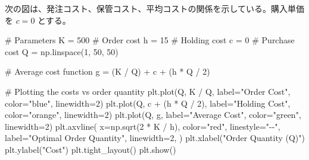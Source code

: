 \documentclass[
  japanese,
  letterpaper,
]{ltjbook}
\newenvironment{Shaded}{\begin{snugshade}}{\end{snugshade}}
\newcommand{\CommentTok}[1]{\textcolor[rgb]{0.37,0.37,0.37}{#1}}
\newcommand{\DecValTok}[1]{\textcolor[rgb]{0.68,0.00,0.00}{#1}}
\newcommand{\NormalTok}[1]{\textcolor[rgb]{0.00,0.23,0.31}{#1}}
\newcommand{\OperatorTok}[1]{\textcolor[rgb]{0.37,0.37,0.37}{#1}}
\newcommand{\StringTok}[1]{\textcolor[rgb]{0.13,0.47,0.30}{#1}}
\theoremstyle{plain}
\theoremstyle{definition}
\theoremstyle{remark}
\begin{document}
次の図は、発注コスト、保管コスト、平均コストの関係を示している。購入単価を
\(c = 0\) とする。

\begin{Shaded}
\begin{Highlighting}[]
\CommentTok{\# Parameters}
\NormalTok{K }\OperatorTok{=} \DecValTok{500}  \CommentTok{\# Order cost}
\NormalTok{h }\OperatorTok{=} \DecValTok{15}  \CommentTok{\# Holding cost}
\NormalTok{c }\OperatorTok{=} \DecValTok{0}  \CommentTok{\# Purchase cost}
\NormalTok{Q }\OperatorTok{=}\NormalTok{ np.linspace(}\DecValTok{1}\NormalTok{, }\DecValTok{50}\NormalTok{, }\DecValTok{50}\NormalTok{)}

\CommentTok{\# Average cost function}
\NormalTok{g }\OperatorTok{=}\NormalTok{ (K }\OperatorTok{/}\NormalTok{ Q) }\OperatorTok{+}\NormalTok{ c }\OperatorTok{+}\NormalTok{ (h }\OperatorTok{*}\NormalTok{ Q }\OperatorTok{/} \DecValTok{2}\NormalTok{)}

\CommentTok{\# Plotting the costs vs order quantity}
\NormalTok{plt.plot(Q, K }\OperatorTok{/}\NormalTok{ Q, label}\OperatorTok{=}\StringTok{"Order Cost"}\NormalTok{, color}\OperatorTok{=}\StringTok{"blue"}\NormalTok{, linewidth}\OperatorTok{=}\DecValTok{2}\NormalTok{)}
\NormalTok{plt.plot(Q, c }\OperatorTok{+}\NormalTok{ (h }\OperatorTok{*}\NormalTok{ Q }\OperatorTok{/} \DecValTok{2}\NormalTok{), label}\OperatorTok{=}\StringTok{"Holding Cost"}\NormalTok{, color}\OperatorTok{=}\StringTok{"orange"}\NormalTok{, linewidth}\OperatorTok{=}\DecValTok{2}\NormalTok{)}
\NormalTok{plt.plot(Q, g, label}\OperatorTok{=}\StringTok{"Average Cost"}\NormalTok{, color}\OperatorTok{=}\StringTok{"green"}\NormalTok{, linewidth}\OperatorTok{=}\DecValTok{2}\NormalTok{)}
\NormalTok{plt.axvline(}
\NormalTok{    x}\OperatorTok{=}\NormalTok{np.sqrt(}\DecValTok{2} \OperatorTok{*}\NormalTok{ K }\OperatorTok{/}\NormalTok{ h),}
\NormalTok{    color}\OperatorTok{=}\StringTok{"red"}\NormalTok{,}
\NormalTok{    linestyle}\OperatorTok{=}\StringTok{"{-}{-}"}\NormalTok{,}
\NormalTok{    label}\OperatorTok{=}\StringTok{"Optimal Order Quantity"}\NormalTok{,}
\NormalTok{    linewidth}\OperatorTok{=}\DecValTok{2}\NormalTok{,}
\NormalTok{)}
\NormalTok{plt.xlabel(}\StringTok{"Order Quantity (Q)"}\NormalTok{)}
\NormalTok{plt.ylabel(}\StringTok{"Cost"}\NormalTok{)}
\NormalTok{plt.tight\_layout()}
\NormalTok{plt.show()  }
\end{Highlighting}
\end{Shaded}
\end{document}

